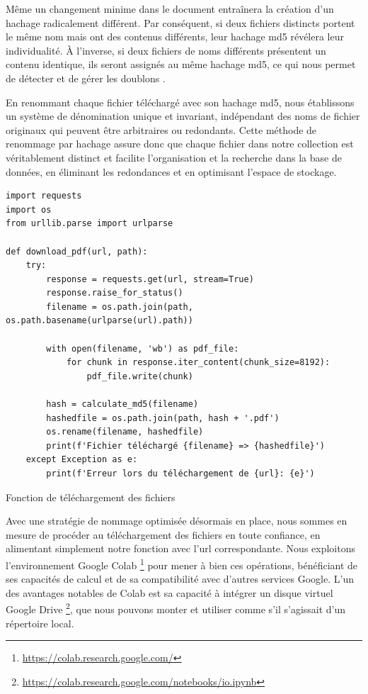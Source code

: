 Même un changement minime dans le document entraînera la création d'un hachage radicalement différent. Par conséquent, si deux fichiers distincts portent le même nom mais ont des contenus différents, leur hachage \ac{md5} révélera leur individualité. À l'inverse, si deux fichiers de noms différents présentent un contenu identique, ils seront assignés au même hachage \ac{md5}, ce qui nous permet de détecter et de gérer les doublons \cite{rfc1321}.

En renommant chaque fichier téléchargé avec son hachage \ac{md5}, nous établissons un système de dénomination unique et invariant, indépendant des noms de fichier originaux qui peuvent être arbitraires ou redondants. Cette méthode de renommage par hachage assure donc que chaque fichier dans notre collection est véritablement distinct et facilite l'organisation et la recherche dans la base de données, en éliminant les redondances et en optimisant l'espace de stockage.

\begin{listing}[!ht]
\begin{verbatim}
import requests
import os
from urllib.parse import urlparse

def download_pdf(url, path):
    try:
        response = requests.get(url, stream=True)
        response.raise_for_status()
        filename = os.path.join(path, os.path.basename(urlparse(url).path))
        
        with open(filename, 'wb') as pdf_file:
            for chunk in response.iter_content(chunk_size=8192):
                pdf_file.write(chunk)
        
        hash = calculate_md5(filename)
        hashedfile = os.path.join(path, hash + '.pdf')
        os.rename(filename, hashedfile)
        print(f'Fichier téléchargé {filename} => {hashedfile}')
    except Exception as e:
        print(f'Erreur lors du téléchargement de {url}: {e}')
\end{verbatim}
\caption{Fonction de téléchargement des fichiers}
\label{appendix:code:python:md5-hashing}
\end{listing}

Avec une stratégie de nommage optimisée désormais en place, nous sommes en mesure de procéder au téléchargement des fichiers en toute confiance, en alimentant simplement notre fonction avec l'\ac{url} correspondante. Nous exploitons l'environnement Google Colab \footnote{\href{https://colab.research.google.com}{https://colab.research.google.com/}} pour mener à bien ces opérations, bénéficiant de ses capacités de calcul et de sa compatibilité avec d'autres services Google. L'un des avantages notables de Colab est sa capacité à intégrer un disque virtuel Google Drive \footnote{\href{https://colab.research.google.com/notebooks/io.ipynb}{https://colab.research.google.com/notebooks/io.ipynb}}, que nous pouvons monter et utiliser comme s'il s'agissait d'un répertoire local.

